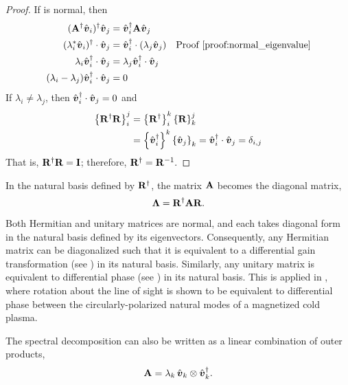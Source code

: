 \begin{proof}
\label{proof:spectral_decomposition}
If  is normal, then
\begin{align*}
( \JM{A}^\dagger \hat{\Jcol{v}}_i )^\dagger \hat{\Jcol{v}}_j
&= \hat{\Jcol{v}}_i^\dagger \JM{A} \hat{\Jcol{v}}_j  \\
%
%
( \lambda_i^* \hat{\Jcol{v}}_i)^\dagger \cdot \hat{\Jcol{v}}_j
&= \hat{\Jcol{v}}_i^\dagger \cdot ( \lambda_j \hat{\Jcol{v}}_j)
 & \text{\Proof{normal_eigenvalue}} \\
%
%
\lambda_i \hat{\Jcol{v}}_i^\dagger \cdot \hat{\Jcol{v}}_j
&= \lambda_j \hat{\Jcol{v}}_i^\dagger \cdot \hat{\Jcol{v}}_j \\
%
%
(\lambda_i-\lambda_j) \hat{\Jcol{v}}_i^\dagger \cdot \hat{\Jcol{v}}_j &= 0
\end{align*}
If $\lambda_i \ne \lambda_j$, then
$\hat{\mbox{\boldmath $v$}}_i^\dagger \cdot \hat{\mbox{\boldmath $v$}}_j = 0$ and
\begin{align*}
\left\{ {\bf R}^\dagger {\bf R} \right\}_i^j 
& = \left\{ {\bf R}^\dagger \right\}_i^k \left\{ {\bf R} \right\}_k^j \\
& = \left\{ \hat{\mbox{\boldmath $v$}}_i^\dagger \right\}^k \left\{ \hat{\mbox{\boldmath $v$}}_j \right\}_k 
  = \hat{\mbox{\boldmath $v$}}_i^\dagger \cdot \hat{\mbox{\boldmath $v$}}_j = \delta_{i,j}
\end{align*}
That is, ${\bf R}^\dagger {\bf R} = {\bf I}$; therefore, ${\bf R}^\dagger={\bf R}^{-1}.$
\end{proof}

In the natural basis defined by ${\bf{R}}^\dagger$, the matrix ${\bf A}$ becomes the diagonal matrix,
%
\begin{equation}
\label{eqn:diagonal_decomposition}
\mbox{\boldmath $\Lambda$} = {\bf R}^\dagger {\bf A} {\bf R}.
\end{equation}
%
Both Hermitian and unitary matrices are normal, and each takes
diagonal form in the natural basis defined by its eigenvectors.  Consequently, any Hermitian matrix can be diagonalized such that it is equivalent to a differential gain transformation (see ) in its natural basis.
%
Similarly, any unitary matrix is equivalent to differential phase (see ) in its natural basis.
%
This is applied in , where rotation about the line of sight is shown to be equivalent to differential phase between the circularly-polarized natural modes of a magnetized cold plasma.



The spectral decomposition can also be written as a linear combination of outer products,
\begin{equation}
{\bf A} = \lambda_k\, \hat{\mbox{\boldmath $v$}}_k \otimes \hat{\mbox{\boldmath $v$}}_k^\dagger.
\label{eqn:spectral_decomposition}
\end{equation}

